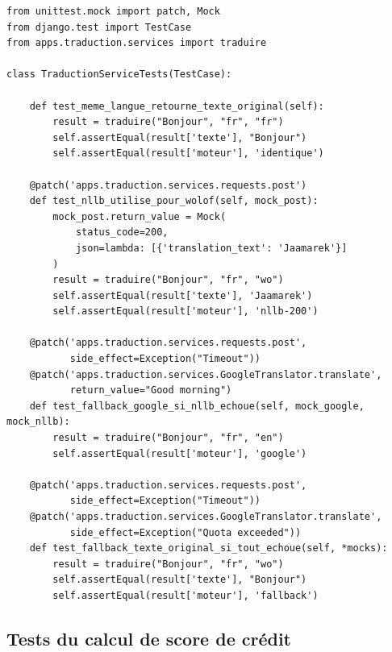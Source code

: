 \documentclass[12pt,a4paper,twoside]{report}
\begin{document}
\begin{lstlisting}[style=pythonstyle, caption={Tests unitaires du service de traduction}]
from unittest.mock import patch, Mock
from django.test import TestCase
from apps.traduction.services import traduire

class TraductionServiceTests(TestCase):

    def test_meme_langue_retourne_texte_original(self):
        result = traduire("Bonjour", "fr", "fr")
        self.assertEqual(result['texte'], "Bonjour")
        self.assertEqual(result['moteur'], 'identique')

    @patch('apps.traduction.services.requests.post')
    def test_nllb_utilise_pour_wolof(self, mock_post):
        mock_post.return_value = Mock(
            status_code=200,
            json=lambda: [{'translation_text': 'Jaamarek'}]
        )
        result = traduire("Bonjour", "fr", "wo")
        self.assertEqual(result['texte'], 'Jaamarek')
        self.assertEqual(result['moteur'], 'nllb-200')

    @patch('apps.traduction.services.requests.post',
           side_effect=Exception("Timeout"))
    @patch('apps.traduction.services.GoogleTranslator.translate',
           return_value="Good morning")
    def test_fallback_google_si_nllb_echoue(self, mock_google, mock_nllb):
        result = traduire("Bonjour", "fr", "en")
        self.assertEqual(result['moteur'], 'google')

    @patch('apps.traduction.services.requests.post',
           side_effect=Exception("Timeout"))
    @patch('apps.traduction.services.GoogleTranslator.translate',
           side_effect=Exception("Quota exceeded"))
    def test_fallback_texte_original_si_tout_echoue(self, *mocks):
        result = traduire("Bonjour", "fr", "wo")
        self.assertEqual(result['texte'], "Bonjour")
        self.assertEqual(result['moteur'], 'fallback')
\end{lstlisting}

\subsection{Tests du calcul de score de crédit}
\end{document}
